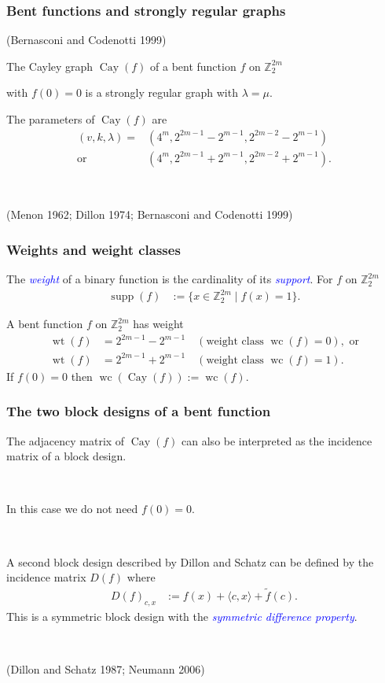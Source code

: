 \documentclass[pdf,sprung,slideColor,nocolorBG]{beamer}
\newcommand{\slidecite}[1]{\tiny{(#1)}\normalsize{}}
\newcommand{\smallcite}[1]{\small{(#1)}\normalsize{}}
\newcommand{\mb}[1]{\mathbb{#1}}
\newcommand{\Emph}[1]{\emph{\textcolor{blue}{#1}}}
\newcommand{\Cay}[1]{\operatorname{Cay}\left(#1\right)}
\newcommand{\dual}[1]{\widetilde{#1}}
\newcommand{\support}[1]{\operatorname{supp}\left(#1\right)}
\newcommand{\weight}[1]{\operatorname{wt}\left(#1\right)}
\newcommand{\weightclass}[1]{\operatorname{wc}\left(#1\right)}
\newcommand{\Z}{\mb{Z}}
\begin{document}
\begin{frame}
\frametitle{Bent functions and strongly regular graphs}

\begin{Theorem}
\smallcite{Bernasconi and Codenotti 1999}

The Cayley graph $\Cay{f}$ of a bent function $f$ on $\Z_2^{2m}$ 

with $f(0)=0$ is a strongly regular graph with $\lambda = \mu.$ 
\end{Theorem}

The parameters of $\Cay{f}$ are
\begin{align*}
(v,k,\lambda) = &(4^m, 2^{2 m - 1} - 2^{m-1}, 2^{2 m - 2} - 2^{m-1}) 
\\
  \text{or} \quad &(4^m, 2^{2 m - 1} + 2^{m-1}, 2^{2 m - 2} + 2^{m-1}).
\end{align*}

~

\slidecite{Menon 1962; Dillon 1974; Bernasconi and Codenotti 1999}
\end{frame}
\begin{frame}
\frametitle{Weights and weight classes}
\begin{Definition}
The \Emph{weight} of a binary function is the cardinality of its \Emph{support}.
For $f$ on $\Z_2^{2m}$
\begin{align*}
\support{f} &:= \{x \in \Z_2^{2m} \mid f(x)=1 \}.  
\end{align*}

A bent function $f$ on $\Z_2^{2m}$ has weight
\begin{align*}
\weight{f} &= 2^{2 m - 1} - 2^{m-1} \quad (\text{weight class~} \weightclass{f}=0), \text{~or}
\\
\weight{f} &= 2^{2 m - 1} + 2^{m-1} \quad (\text{weight class~} \weightclass{f}=1).
\end{align*}
If $f(0)=0$ then $\weightclass{\Cay{f}} := \weightclass{f}$.
\end{Definition}
\end{frame}
\begin{frame}
\frametitle{The two block designs of a bent function}

The adjacency matrix of $\Cay{f}$ can also be interpreted as the incidence matrix of a block design.

~

In this case we do not need $f(0)=0$.

~
\begin{Definition}
A second block design described by Dillon and Schatz can be defined by the incidence matrix $D(f)$ where
\begin{align*}
D(f)_{c,x} &:= f(x) + \langle c, x \rangle + \dual{f}(c).   
\end{align*}
This is a symmetric block design with the \Emph{symmetric difference property}.
\end{Definition}

~

\slidecite{Dillon and Schatz 1987; Neumann 2006}
\end{frame}
\end{document}
